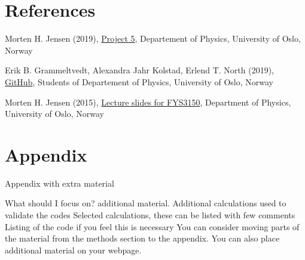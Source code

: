 \documentclass{article}
\begin{document}

\vspace{1cm}

\section{References} \label{sec:References}

\iffalse
What should I focus on? References.
Give always references to material you base your work on, either scientific articles/reports or books.
Refer to articles as: name(s) of author(s), journal, volume (boldfaced), page and year in parenthesis.
Refer to books as: name(s) of author(s), title of book, publisher, place and year, eventual page numbers
\fi

\begin{thebibliography}{}

Morten H. Jensen (2019), \href{https://github.com/CompPhysics/ComputationalPhysics/blob/master/doc/Projects/2019/Project5/SolarSystem/pdf/SolarSystem.pdf}{Project 5}, Departement of Physics, University of Oslo, Norway

Erik B. Grammeltvedt, Alexandra Jahr Kolstad, Erlend T. North (2019), \href{https://github.com/Erikbgram/Fys3150}{GitHub}, Students of Departement of Physics, University of Oslo, Norway

Morten H. Jensen (2015), \href{https://github.com/CompPhysics/ComputationalPhysics/blob/master/doc/Lectures/lectures2015.pdf}{Lecture slides for FYS3150}, Department of Physics, University of Oslo, Norway


\end{thebibliography}


\vspace{1cm}


\appendix
\section{Appendix} \label{sec:Appendix}

Appendix with extra material


What should I focus on? additional material.
Additional calculations used to validate the codes
Selected calculations, these can be listed with few comments
Listing of the code if you feel this is necessary
You can consider moving parts of the material from the methods section to the appendix. You can also place additional material on your webpage.
\end{document}
